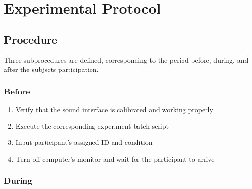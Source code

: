 \documentclass[../main.tex]{subfiles}
\begin{document}
\chapter{Experimental Protocol}
\label{cha:experimental_protocol}

\section{Procedure}

Three subprocedures are defined, corresponding to the period before, during, and
after the subjects participation.

\subsection{Before}

\begin{enumerate}
  \item Verify that the sound interface is calibrated and working properly
  \item Execute the corresponding experiment batch script\footnotemark[1]
  \item Input participant's assigned ID and condition\footnotemark[2]
  \item Turn off computer's monitor and wait for the participant to arrive
\end{enumerate}


\subsection{During}
\end{document}
